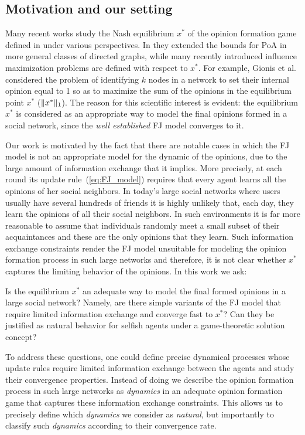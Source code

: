 \subsection{Motivation and our setting}

Many recent works study the Nash equilibrium $x^*$ of the opinion formation
game defined in \cite{BKO11} under various perspectives. In \cite{CCL16} they
extended the bounds for PoA in more general classes of directed graphs, while
many recently introduced influence maximization problems
\cite{GTT13,AKPT18,MMT17} are defined with respect to $x^*$.  For example,
Gionis et al. \cite{GTT13} considered the problem of identifying $k$ nodes in a
network to set their internal opinion equal to 1 so as to maximize the sum of
the opinions in the equilibrium point $x^*$ ($\norm{1}{x^*}$).  The reason for
this scientific interest is evident: the equilibrium $x^*$ is considered as an
appropriate way to model the final opinions formed in a social network, since
the \emph{well established} FJ model converges to it.

Our work is motivated by the fact that there are notable cases in which the FJ
model is not an appropriate model for the dynamic of the opinions, due to the
large amount of information exchange that it implies.  More precisely, at each
round its update rule~(\ref{eq:FJ_model}) requires that every agent learns all
the opinions of her social neighbors.  In today's large social networks where
users usually have several hundreds of friends it is highly unlikely that, each
day, they learn the opinions of all their social neighbors.  In such
environments it is far more reasonable to assume that individuals randomly meet
a small subset of their acquaintances and these are the only opinions that they
learn. Such information exchange constraints render the FJ model unsuitable for
modeling the opinion formation process in such large networks and therefore, it
is not clear whether $x^*$ captures the limiting behavior of the opinions. In
this work we ask:
%
\begin{question}\label{q:motivation1}
  Is the equilibrium $x^*$ an adequate way to model the final formed opinions
  in a large social network? Namely, are there simple variants of the FJ model
  that require limited information exchange and converge fast to $x^*$? Can
  they be justified as natural behavior for selfish agents under a
  game-theoretic solution concept?
\end{question}

To address these questions, one could define precise dynamical processes whose
update rules require limited information exchange between the agents and study
their convergence properties. Instead of doing we describe the opinion
formation process in such large networks as \emph{dynamics} in an adequate
opinion formation game that captures these information exchange constraints.
This allows us to precisely define which \emph{dynamics} we consider as
\emph{natural}, but importantly to classify such \emph{dynamics} according to
their convergence rate.

